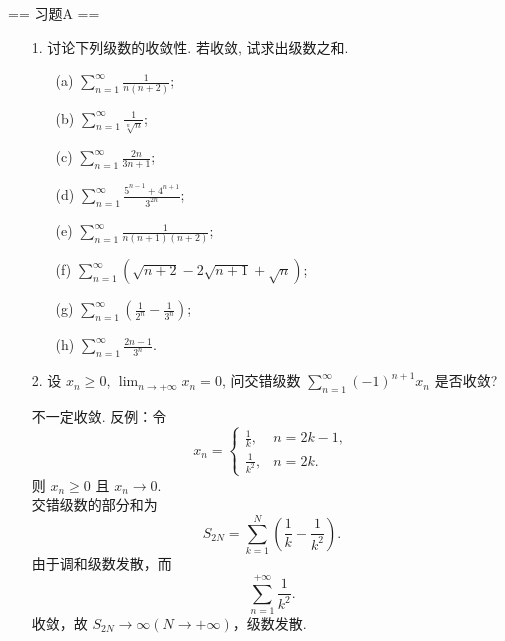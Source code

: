 \newenvironment{solution}{\begin{proofc}[解答]}{\end{proofc}}

== 习题A ==

\begin{enumerate}
    \item[1.]讨论下列级数的收敛性. 若收敛, 试求出级数之和.
    \begin{enumerate}
        \item[(a)]$\displaystyle \sum_{n=1}^{\infty}\frac{1}{n(n+2)}$;
        \item[(b)]$\displaystyle \sum_{n=1}^{\infty}\frac{1}{\sqrt[n]{n}}$;
        \item[(c)]$\displaystyle \sum_{n=1}^{\infty}\frac{2n}{3n+1}$;
        \item[(d)]$\displaystyle \sum_{n=1}^{\infty}\frac{5^{n-1}+4^{n+1}}{3^{2n}}$;
        \item[(e)]$\displaystyle \sum_{n=1}^{\infty}\frac{1}{n(n+1)(n+2)}$;
        \item[(f)]$\displaystyle \sum_{n=1}^{\infty}(\sqrt{n+2}-2\sqrt{n+1}+\sqrt{n})$;
        \item[(g)]$\displaystyle \sum_{n=1}^{\infty}\left(\frac{1}{2^{n}}-\frac{1}{3^{n}}\right)$;
        \item[(h)]$\displaystyle \sum_{n=1}^{\infty}\frac{2n-1}{3^{n}}$.
    \end{enumerate}

    \item[2.]设 \(\displaystyle x_{n} \geq 0\), \(\displaystyle \lim_{n \to +\infty} x_{n} = 0\), 
    问交错级数 \(\displaystyle\sum_{n=1}^{\infty} (-1)^{n+1} x_{n}\) 是否收敛?
    \begin{solution}
        不一定收敛. 反例：令
        \[\displaystyle
        x_n = \begin{cases}
            \frac{1}{k}, & n=2k-1, \\
            \frac{1}{k^2}, & n=2k.
        \end{cases}
        \] 则 $x_n \geq 0$ 且 $x_n \to 0$.\\
        交错级数的部分和为
        \[
        S_{2N} = \sum_{k=1}^{N} \left(\frac{1}{k} - \frac{1}{k^2}\right).
        \]
        由于调和级数发散，而
        \[
        \sum_{n=1}^{+\infty} \frac{1}{k^2}.
        \] 收敛，故 $\displaystyle S_{2N} \to \infty(N\to +\infty)$，级数发散.
    \end{solution}


\end{enumerate}
